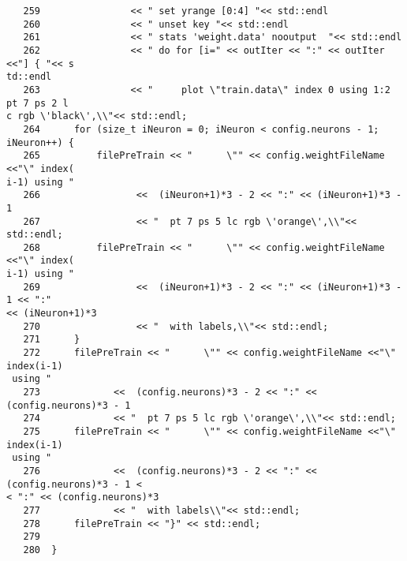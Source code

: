 \begin{verbatim}
   259	              << " set yrange [0:4] "<< std::endl
   260	              << " unset key "<< std::endl              
   261	              << " stats 'weight.data' nooutput  "<< std::endl
   262	              << " do for [i=" << outIter << ":" << outIter <<"] { "<< s
td::endl
   263	              << "     plot \"train.data\" index 0 using 1:2 pt 7 ps 2 l
c rgb \'black\',\\"<< std::endl;
   264	    for (size_t iNeuron = 0; iNeuron < config.neurons - 1; iNeuron++) {
   265	        filePreTrain << "      \"" << config.weightFileName <<"\" index(
i-1) using " 
   266	               <<  (iNeuron+1)*3 - 2 << ":" << (iNeuron+1)*3 - 1
   267	               << "  pt 7 ps 5 lc rgb \'orange\',\\"<< std::endl;
   268	        filePreTrain << "      \"" << config.weightFileName <<"\" index(
i-1) using " 
   269	               <<  (iNeuron+1)*3 - 2 << ":" << (iNeuron+1)*3 - 1 << ":" 
<< (iNeuron+1)*3
   270	               << "  with labels,\\"<< std::endl;
   271	    }
   272	    filePreTrain << "      \"" << config.weightFileName <<"\" index(i-1)
 using " 
   273	           <<  (config.neurons)*3 - 2 << ":" << (config.neurons)*3 - 1
   274	           << "  pt 7 ps 5 lc rgb \'orange\',\\"<< std::endl;
   275	    filePreTrain << "      \"" << config.weightFileName <<"\" index(i-1)
 using " 
   276	           <<  (config.neurons)*3 - 2 << ":" << (config.neurons)*3 - 1 <
< ":" << (config.neurons)*3
   277	           << "  with labels\\"<< std::endl;
   278	    filePreTrain << "}" << std::endl;
   279	
   280	}
\end{verbatim}

